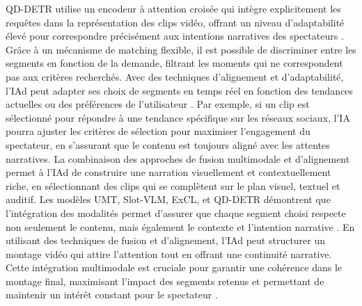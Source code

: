 \documentclass[livre]{udes-genie-these}
\begin{document}
QD-DETR utilise un encodeur à attention croisée qui intègre explicitement les requêtes dans la représentation des clips vidéo, offrant un niveau d'adaptabilité élevé pour correspondre précisément aux intentions narratives des spectateurs \cite{lei2021_moments}. Grâce à un mécanisme de matching flexible, il est possible de discriminer entre les segments en fonction de la demande, filtrant les moments qui ne correspondent pas aux critères recherchés.
Avec des techniques d'alignement et d'adaptabilité, l'IAd peut adapter ses choix de segments en temps réel en fonction des tendances actuelles ou des préférences de l'utilisateur \cite{ghosh2019_excl}\cite{lei2021_moments}. Par exemple, si un clip est sélectionné pour répondre à une tendance spécifique sur les réseaux sociaux, l'IA pourra ajuster les critères de sélection pour maximiser l'engagement du spectateur, en s'assurant que le contenu est toujours aligné avec les attentes narratives.
La combinaison des approches de fusion multimodale et d'alignement permet à l'IAd de construire une narration visuellement et contextuellement riche, en sélectionnant des clips qui se complètent sur le plan visuel, textuel et auditif. Les modèles UMT, Slot-VLM, ExCL, et QD-DETR démontrent que l'intégration des modalités permet d'assurer que chaque segment choisi respecte non seulement le contenu, mais également le contexte et l'intention narrative \cite{liu2022_umt}\cite{xu2024}\cite{ghosh2019_excl}\cite{lei2021_moments}.
En utilisant des techniques de fusion et d'alignement, l'IAd peut structurer un montage vidéo qui attire l'attention tout en offrant une continuité narrative. Cette intégration multimodale est cruciale pour garantir une cohérence dans le montage final, maximisant l'impact des segments retenus et permettant de maintenir un intérêt constant pour le spectateur \cite{liu2022_umt}\cite{xu2024}\cite{ghosh2019_excl}.
\end{document}
